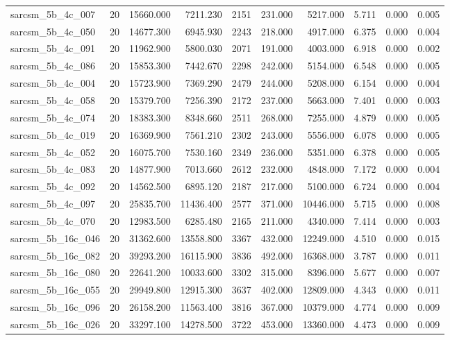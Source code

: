 \begin{tabular}{lrrrrrrrrr}
sarcsm\_5b\_4c\_007 & 20 & 15660.000 & 7211.230 & 2151 & 231.000 & 5217.000 & 5.711 & 0.000 & 0.005 \\
sarcsm\_5b\_4c\_050 & 20 & 14677.300 & 6945.930 & 2243 & 218.000 & 4917.000 & 6.375 & 0.000 & 0.004 \\
sarcsm\_5b\_4c\_091 & 20 & 11962.900 & 5800.030 & 2071 & 191.000 & 4003.000 & 6.918 & 0.000 & 0.002 \\
sarcsm\_5b\_4c\_086 & 20 & 15853.300 & 7442.670 & 2298 & 242.000 & 5154.000 & 6.548 & 0.000 & 0.005 \\
sarcsm\_5b\_4c\_004 & 20 & 15723.900 & 7369.290 & 2479 & 244.000 & 5208.000 & 6.154 & 0.000 & 0.004 \\
sarcsm\_5b\_4c\_058 & 20 & 15379.700 & 7256.390 & 2172 & 237.000 & 5663.000 & 7.401 & 0.000 & 0.003 \\
sarcsm\_5b\_4c\_074 & 20 & 18383.300 & 8348.660 & 2511 & 268.000 & 7255.000 & 4.879 & 0.000 & 0.005 \\
sarcsm\_5b\_4c\_019 & 20 & 16369.900 & 7561.210 & 2302 & 243.000 & 5556.000 & 6.078 & 0.000 & 0.005 \\
sarcsm\_5b\_4c\_052 & 20 & 16075.700 & 7530.160 & 2349 & 236.000 & 5351.000 & 6.378 & 0.000 & 0.005 \\
sarcsm\_5b\_4c\_083 & 20 & 14877.900 & 7013.660 & 2612 & 232.000 & 4848.000 & 7.172 & 0.000 & 0.004 \\
sarcsm\_5b\_4c\_092 & 20 & 14562.500 & 6895.120 & 2187 & 217.000 & 5100.000 & 6.724 & 0.000 & 0.004 \\
sarcsm\_5b\_4c\_097 & 20 & 25835.700 & 11436.400 & 2577 & 371.000 & 10446.000 & 5.715 & 0.000 & 0.008 \\
sarcsm\_5b\_4c\_070 & 20 & 12983.500 & 6285.480 & 2165 & 211.000 & 4340.000 & 7.414 & 0.000 & 0.003 \\
sarcsm\_5b\_16c\_046 & 20 & 31362.600 & 13558.800 & 3367 & 432.000 & 12249.000 & 4.510 & 0.000 & 0.015 \\
sarcsm\_5b\_16c\_082 & 20 & 39293.200 & 16115.900 & 3836 & 492.000 & 16368.000 & 3.787 & 0.000 & 0.011 \\
sarcsm\_5b\_16c\_080 & 20 & 22641.200 & 10033.600 & 3302 & 315.000 & 8396.000 & 5.677 & 0.000 & 0.007 \\
sarcsm\_5b\_16c\_055 & 20 & 29949.800 & 12915.300 & 3637 & 402.000 & 12809.000 & 4.343 & 0.000 & 0.011 \\
sarcsm\_5b\_16c\_096 & 20 & 26158.200 & 11563.400 & 3816 & 367.000 & 10379.000 & 4.774 & 0.000 & 0.009 \\
sarcsm\_5b\_16c\_026 & 20 & 33297.100 & 14278.500 & 3722 & 453.000 & 13360.000 & 4.473 & 0.000 & 0.009 \\

\end{tabular}
